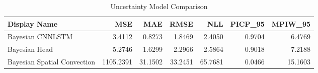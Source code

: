 \begin{table}
\caption{Uncertainty Model Comparison}
\begin{tabular}{lrrrrrr}
\toprule
Display Name & MSE & MAE & RMSE & NLL & PICP_95 & MPIW_95 \\
\midrule
Bayesian CNNLSTM & 3.4112 & 0.8273 & 1.8469 & 2.4050 & 0.9704 & 6.4769 \\
Bayesian Head & 5.2746 & 1.6299 & 2.2966 & 2.5864 & 0.9018 & 7.2188 \\
Bayesian Spatial Convection & 1105.2391 & 31.1502 & 33.2451 & 65.7681 & 0.0466 & 15.1603 \\
\bottomrule
\end{tabular}
\end{table}
